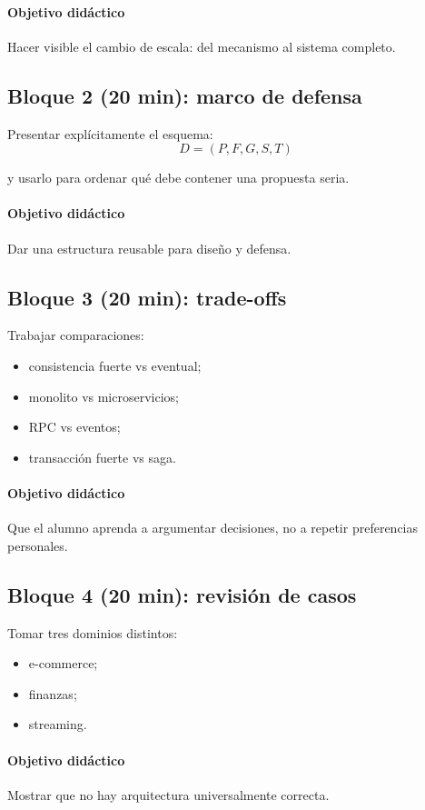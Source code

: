 \documentclass[variant=docente,cover=institutional,mode=screen]{ua-engineering-v6-article}
\begin{document}
\paragraph{Objetivo didáctico}
Hacer visible el cambio de escala: del mecanismo al sistema completo.

\subsection*{Bloque 2 (20 min): marco de defensa}
Presentar explícitamente el esquema:
\[
D = (P,F,G,S,T)
\]

y usarlo para ordenar qué debe contener una propuesta seria.

\paragraph{Objetivo didáctico}
Dar una estructura reusable para diseño y defensa.

\subsection*{Bloque 3 (20 min): trade-offs}
Trabajar comparaciones:
\begin{itemize}
\item consistencia fuerte vs eventual;
\item monolito vs microservicios;
\item RPC vs eventos;
\item transacción fuerte vs saga.
\end{itemize}

\paragraph{Objetivo didáctico}
Que el alumno aprenda a argumentar decisiones, no a repetir preferencias personales.

\subsection*{Bloque 4 (20 min): revisión de casos}
Tomar tres dominios distintos:
\begin{itemize}
\item e-commerce;
\item finanzas;
\item streaming.
\end{itemize}

\paragraph{Objetivo didáctico}
Mostrar que no hay arquitectura universalmente correcta.
\end{document}
